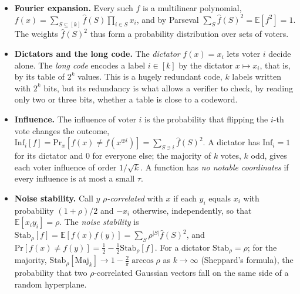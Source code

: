 \documentclass[handoutsbeamer.tex]{subfiles}
\begin{document}
\begin{frame}
\onp{\scriptsize}
\begin{itemize}\setlength\itemsep{0.25em}
    \item \textbf{Fourier expansion.} Every such $f$ is a multilinear polynomial, $f(x) = \sum_{S\subseteq[k]}\hat f(S)\prod_{i\in S}x_i$, and by Parseval $\sum_S\hat f(S)^2 = \mathbb E[f^2] = 1$. The weights $\hat f(S)^2$ thus form a probability distribution over sets of voters.
    \item \textbf{Dictators and the long code.} The \emph{dictator} $f(x) = x_i$ lets voter $i$ decide alone. The \emph{long code} encodes a label $i\in[k]$ by the dictator $x\mapsto x_i$, that is, by its table of $2^k$ values. This is a hugely redundant code, $k$ labels written with $2^k$ bits, but its redundancy is what allows a verifier to check, by reading only two or three bits, whether a table is close to a codeword.
    \item \textbf{Influence.} The influence of voter $i$ is the probability that flipping the $i$-th vote changes the outcome, $\mathrm{Inf}_i[f] = \mathrm{Pr}_x[f(x)\ne f(x^{\oplus i})] = \sum_{S\ni i}\hat f(S)^2$. A dictator has $\mathrm{Inf}_i = 1$ for its dictator and $0$ for everyone else; the majority of $k$ votes, $k$ odd, gives each voter influence of order $1/\sqrt k$. A function has \emph{no notable coordinates} if every influence is at most a small $\tau$.
    \item \textbf{Noise stability.} Call $y$ \emph{$\rho$-correlated} with $x$ if each $y_i$ equals $x_i$ with probability $(1+\rho)/2$ and $-x_i$ otherwise, independently, so that $\mathbb E[x_iy_i] = \rho$. The \emph{noise stability} is $\mathrm{Stab}_\rho[f] = \mathbb E[f(x)f(y)] = \sum_S\rho^{|S|}\hat f(S)^2$, and $\mathrm{Pr}[f(x)\ne f(y)] = \tfrac12 - \tfrac12\mathrm{Stab}_\rho[f]$. For a dictator $\mathrm{Stab}_\rho = \rho$; for the majority, $\mathrm{Stab}_\rho[\mathrm{Maj}_k] \to 1 - \tfrac2\pi\arccos\rho$ as $k\to\infty$ (Sheppard's formula), the probability that two $\rho$-correlated Gaussian vectors fall on the same side of a random hyperplane.
\end{itemize}
\end{frame}
\end{document}
